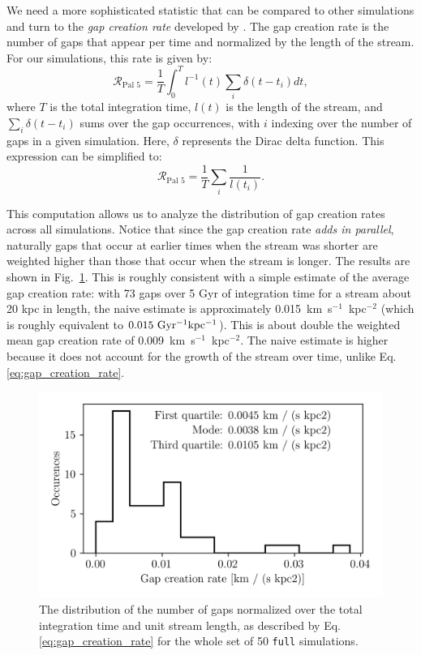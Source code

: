 \documentclass{aa}
\begin{document}
    We need a more sophisticated statistic that can be compared to other simulations and turn to the \textit{gap creation rate} developed by \citet{2012ApJ...748...20C}. The gap creation rate is the number of gaps that appear per time and normalized by the length of the stream. For our simulations, this rate is given by: \begin{equation} \label{eq:gap_creation_rate} \mathcal{R}_{\textrm{Pal 5}} =  \frac{1}{T}\int_{0}^T l^{-1}(t) \sum_i \delta(t-t_i) dt,\end{equation}where $T$ is the total integration time, $l(t)$ is the length of the stream, and $\sum_i \delta(t-t_i)$ sums over the gap occurrences, with $i$ indexing over the number of gaps in a given simulation. Here, $\delta$ represents the Dirac delta function. This expression can be simplified to:\begin{equation}\mathcal{R}_{\textrm{Pal 5}} =  \frac{1}{T} \sum_i \frac{1}{l (t_i)}. \end{equation}
    
    This computation allows us to analyze the distribution of gap creation rates across all simulations. Notice that since the gap creation rate \textit{adds in parallel}, naturally gaps that occur at earlier times when the stream was shorter are weighted higher than those that occur when the stream is longer. The results are shown in Fig.~\ref{fig:gapcreationrate}. This is roughly consistent with a simple estimate of the average gap creation rate: with 73 gaps over 5 Gyr of integration time for a stream about 20 kpc in length, the naive estimate is approximately 0.015~km~s$^{-1}$~kpc$^{-2} $ (which is roughly equivalent to $0.015~\rm{Gyr^{-1}kpc^{-1}}$). This is about double the weighted mean gap creation rate of 0.009~km~s$^{-1}$~kpc$^{-2}$. The naive estimate is higher because it does not account for the growth of the stream over time, unlike Eq.\ref{eq:gap_creation_rate}.

    \begin{figure}
      \centering
      \includegraphics[width=\linewidth]{gap_creation_rate.png}
      \caption{The distribution of the number of gaps normalized over the total integration time and unit stream length, as described by Eq.\ref{eq:gap_creation_rate} for the whole set of 50 \texttt{full} simulations. }
      \label{fig:gapcreationrate}
    \end{figure}
\end{document}

